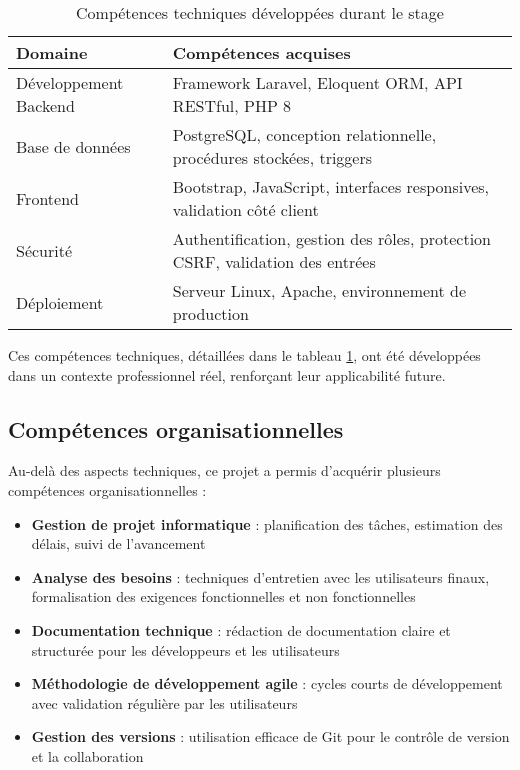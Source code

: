 \begin{table}[H]
\centering
\caption{Compétences techniques développées durant le stage}
\label{tab:competences_tech}
\begin{tabular}{|p{5cm}|p{9cm}|}
\hline
\textbf{Domaine} & \textbf{Compétences acquises} \\
\hline
Développement Backend & Framework Laravel, Eloquent ORM, API RESTful, PHP 8 \\
\hline
Base de données & PostgreSQL, conception relationnelle, procédures stockées, triggers \\
\hline
Frontend & Bootstrap, JavaScript, interfaces responsives, validation côté client \\
\hline
Sécurité & Authentification, gestion des rôles, protection CSRF, validation des entrées \\
\hline
Déploiement & Serveur Linux, Apache, environnement de production \\
\hline
\end{tabular}
\end{table}

Ces compétences techniques, détaillées dans le tableau \ref{tab:competences_tech}, ont été développées dans un contexte professionnel réel, renforçant leur applicabilité future.

\subsection{Compétences organisationnelles}
Au-delà des aspects techniques, ce projet a permis d'acquérir plusieurs compétences organisationnelles :

\begin{itemize}
    \item \textbf{Gestion de projet informatique} : planification des tâches, estimation des délais, suivi de l'avancement
    
    \item \textbf{Analyse des besoins} : techniques d'entretien avec les utilisateurs finaux, formalisation des exigences fonctionnelles et non fonctionnelles
    
    \item \textbf{Documentation technique} : rédaction de documentation claire et structurée pour les développeurs et les utilisateurs
    
    \item \textbf{Méthodologie de développement agile} : cycles courts de développement avec validation régulière par les utilisateurs
    
    \item \textbf{Gestion des versions} : utilisation efficace de Git pour le contrôle de version et la collaboration
\end{itemize}

